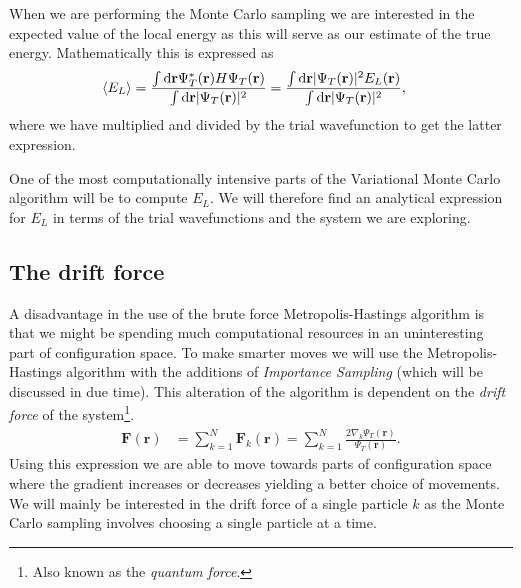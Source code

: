 \documentclass[
    a4paper, aps, twocolumn, floatfix, superscriptaddress,
    nofootinbib]{revtex4-1}
\newcommand{\vf}{\mathbf}
\newcommand{\1}{\mathds{1}}
\begin{document}
        When we are performing the Monte Carlo sampling we are interested in the
        expected value of the local energy as this will serve as our estimate of
        the true energy. Mathematically this is expressed as
        \begin{align}
            \expval{E_L}
            &=
            \frac{\int\dd \vf{r}\Psi_T^{*}(\vf{r})H\Psi_T(\vf{r})}
            {\int\dd \vf{r}|\Psi_T(\vf{r})|^2}
            =
            \frac{
                \int\dd \vf{r}|\Psi_T(\vf{r})|^2 E_L(\vf{r})
            }{
                \int\dd \vf{r}|\Psi_T(\vf{r})|^2
            },
        \end{align}
        where we have multiplied and divided by the trial wavefunction to get
        the latter expression.

        One of the most computationally intensive parts of the Variational Monte
        Carlo algorithm will be to compute $E_L$. We will therefore find an
        analytical expression for $E_L$ in terms of the trial wavefunctions and
        the system we are exploring.

    \subsection{The drift force}
        A disadvantage in the use of the brute force Metropolis-Hastings
        algorithm is that we might be spending much computational resources in
        an uninteresting part of configuration space. To make smarter moves we
        will use the Metropolis-Hastings algorithm with the additions of
        \emph{Importance Sampling}  (which will be discussed in due time). This
        alteration of the algorithm is dependent on the \emph{drift force} of
        the system\footnote{Also known as the \emph{quantum force}.}.
        \begin{align}
            \vf{F}(\vf{r})
            &=
            \sum_{k = 1}^N
            \vf{F}_k(\vf{r})
            =
            \sum_{k = 1}^N
            \frac{2\nabla_k\Psi_T(\vf{r})}{\Psi_T(\vf{r})}.
            \label{eq:drift_force}
        \end{align}
        Using this expression we are able to move towards parts of
        configuration space where the gradient increases or decreases yielding a
        better choice of movements. We will mainly be interested in the drift
        force of a single particle $k$ as the Monte Carlo sampling involves
        choosing a single particle at a time.
\end{document}
